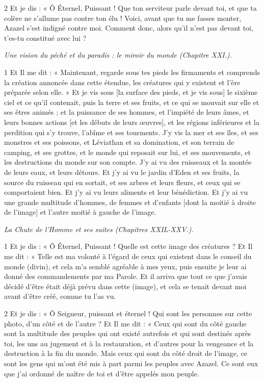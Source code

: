 \par 2 Et je dis : « Ô Éternel, Puissant ! Que ton serviteur parle devant toi, et que ta colère ne s'allume pas contre ton élu ! Voici, avant que tu me fasses monter, Azazel s'est indigné contre moi. Comment donc, alors qu’il n’est pas devant toi, t’es-tu constitué avec lui ?


\par \textit{Une vision du péché et du paradis : le miroir du monde (Chapitre XXI.).}

\par 1 Et Il me dit : « Maintenant, regarde sous tes pieds les firmaments et comprends la création annoncée dans cette étendue, les créatures qui y existent et l'ère préparée selon elle. » Et je vis sous [la surface des pieds, et je vis sous] le sixième ciel et ce qu'il contenait, puis la terre et ses fruits, et ce qui se mouvait sur elle et ses êtres animés ; et la puissance de ses hommes, et l'impiété de leurs âmes, et leurs bonnes actions [et les débuts de leurs œuvres], et les régions inférieures et la perdition qui s'y trouve, l'abîme et ses tourments. J'y vis la mer et ses îles, et ses monstres et ses poissons, et Léviathan et sa domination, et son terrain de camping, et ses grottes, et le monde qui reposait sur lui, et ses mouvements, et les destructions du monde sur son compte. J'y ai vu des ruisseaux et la montée de leurs eaux, et leurs détours. Et j'y ai vu le jardin d'Eden et ses fruits, la source du ruisseau qui en sortait, et ses arbres et leurs fleurs, et ceux qui se comportaient bien. Et j'y ai vu leurs aliments et leur bénédiction. Et j'y ai vu une grande multitude d'hommes, de femmes et d'enfants [dont la moitié à droite de l'image] et l'autre moitié à gauche de l'image.


\par \textit{La Chute de l'Homme et ses suites (Chapitres XXIL-XXV.).}

\par 1 Et je dis : « Ô Éternel, Puissant ! Quelle est cette image des créatures ? Et Il me dit : « Telle est ma volonté à l'égard de ceux qui existent dans le conseil du monde (divin), et cela m'a semblé agréable à mes yeux, puis ensuite je leur ai donné des commandements par ma Parole. Et il arriva que tout ce que j'avais décidé d'être était déjà prévu dans cette (image), et cela se tenait devant moi avant d'être créé, comme tu l'as vu.

\par 2 Et je dis : « Ô Seigneur, puissant et éternel ! Qui sont les personnes sur cette photo, d’un côté et de l’autre ? Et Il me dit : « Ceux qui sont du côté gauche sont la multitude des peuples qui ont existé autrefois et qui sont destinés après toi, les uns au jugement et à la restauration, et d'autres pour la vengeance et la destruction à la fin du monde. Mais ceux qui sont du côté droit de l’image, ce sont les gens qui m’ont été mis à part parmi les peuples avec Azazel. Ce sont eux que j’ai ordonné de naître de toi et d’être appelés mon peuple.

